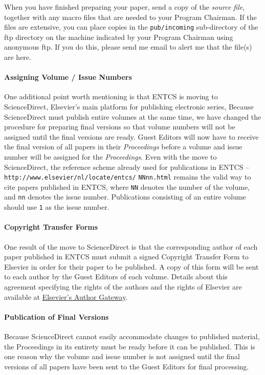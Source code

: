 \documentclass{entcs} \usepackage{entcsmacro}
\begin{document}
When you have finished preparing your paper, send a copy of the
\emph{source file}, together with any macro files that are needed to
your Program Chairman.  If the files are extensive, you can place
copies in the \texttt{pub/incoming} sub-directory of the ftp directory
on the machine indicated by your Program Chairman using anonymous ftp.
If you do this, please send me email to alert me that the file(s) are
here.

\paragraph{Assigning Volume / Issue Numbers}
One additional point worth mentioning is that ENTCS is moving to
ScienceDirect, Elsevier's main platform for publishing electronic
series, Because ScienceDirect must publish entire volumes at the same
time, we have changed the procedure for preparing final versions so
that volume numbers will not be assigned until the final versions are
ready. Guest Editors will now have to receive the final version of all
papers in their \emph{Proceedings} before a volume and issue number
will be assigned for the \emph{Proceedings}. Even with the move to
ScienceDirect, the reference scheme already used for publications in
ENTCS -- \texttt{http://www.elsevier/nl/locate/entcs/}
\texttt{NNnn.html} remains the valid way to cite papers published in
ENTCS, where \texttt{NN} denotes the number of the volume, and
\texttt{nn} denotes the issue number.  Publications consisting of an
entire volume should use \texttt{1} as the issue number.

\paragraph{Copyright Transfer Forms}
One result of the move to ScienceDirect is that the corresponding
author of each paper published in ENTCS must submit a signed Copyright
Transfer Form to Elsevier in order for their paper to be published. A
copy of this form will be sent to each author by the Guest Editors of
each volume. Details about this agreement specifying the rights of the
authors and the rights of Elsevier are available at
\href{http://authors.elsevier.com/PublisherInfoDetail.html?dc=AGI}{Elsevier's
  Author Gateway}. 

\paragraph{Publication of Final Versions}
Because ScienceDirect cannot easily accommodate changes to published
material, the Proceedings in its entirety must be ready before it can
be published. This is one reason why the volume and issue number is
not assigned until the final versions of all papers have been sent to
the Guest Editors for final processing. 
\end{document}
